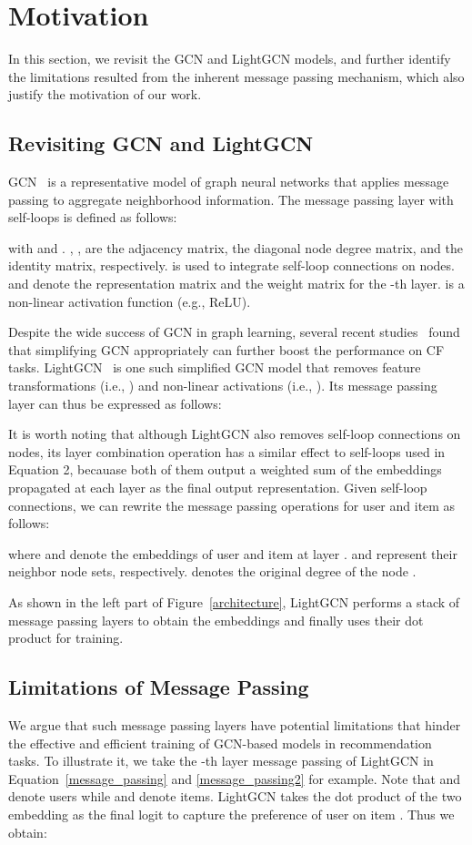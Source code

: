 \documentclass[sigconf,authorversion]{acmart}
\begin{document}
 \section{Motivation} \label{motivation}
In this section, we revisit the GCN and LightGCN models, and further identify the limitations resulted from the inherent message passing mechanism, which also justify the motivation of our work.

 


\subsection{Revisiting GCN and LightGCN}
GCN~\cite{GCN} is a representative model of graph neural networks that applies message passing to aggregate neighborhood information. The message passing layer with self-loops is defined as follows:

with  and . , ,  are the adjacency matrix, the diagonal node degree matrix, and the identity matrix, respectively.  is used to integrate self-loop connections on nodes.  and  denote the representation matrix and the weight matrix for the -th layer.  is a non-linear activation function (e.g., ReLU). 

Despite the wide success of GCN in graph learning, several recent studies~\cite{LightGCN,LR-GCCF,RGCF,SGCN} found that simplifying GCN appropriately can further boost the performance on CF tasks. LightGCN~\cite{LightGCN} is one such simplified GCN model that removes feature transformations (i.e., ) and non-linear activations (i.e., ). Its message passing layer can thus be expressed as follows:

It is worth noting that although LightGCN also removes self-loop connections on nodes, its layer combination operation has a similar effect to self-loops used in Equation 2, becauase both of them output a weighted sum of the embeddings propagated at each layer as the final output representation. Given self-loop connections, we can rewrite the message passing operations for user  and item  as follows:

where  and  denote the embeddings of user  and item  at layer .  and  represent their neighbor node sets, respectively.  denotes the original degree of the node . 

As shown in the left part of Figure~\ref{architecture}, LightGCN performs a stack of message passing layers to obtain the embeddings and finally uses their dot product for training.  


\subsection{Limitations of Message Passing}
\label{limitation_of_mp}
We argue that such message passing layers have potential limitations that hinder the effective and efficient training of GCN-based models in recommendation tasks. To illustrate it, we take the -th layer message passing of LightGCN in Equation~\ref{message_passing} and \ref{message_passing2} for example. Note that  and  denote users while  and  denote items. LightGCN takes the dot product of the two embedding as the final logit to capture the preference of user  on item . Thus we obtain:
\end{document}

